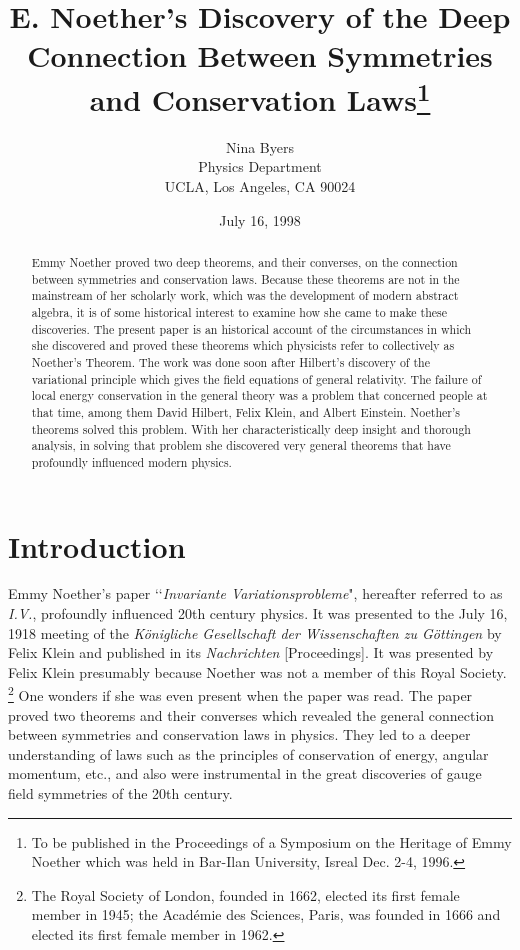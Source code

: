 \documentclass[12pt]{article}
\begin{document}
\title{E. Noether's Discovery of the Deep Connection Between
Symmetries and
                   Conservation Laws\footnote{To be published in
the Proceedings of a
Symposium on the Heritage of Emmy Noether which was held in 
Bar-Ilan University, Isreal Dec. 2-4,
1996.}}


\author{Nina Byers \\Physics
Department\\ UCLA, Los Angeles, CA 90024}
 \date{July 16, 1998}
 \maketitle

\begin{abstract} 
Emmy Noether proved two deep theorems, and their converses, on
 the connection between symmetries and conservation laws. Because these
 theorems are not in the mainstream of her scholarly work, 
  which was the development of modern
 abstract algebra,  it is of some historical interest to examine how
 she came to make these discoveries.  The present paper is an historical account of the
 circumstances in which she  discovered and proved  these theorems which
 physicists refer to collectively as Noether's Theorem.  The work was done 
 soon after  Hilbert's discovery of the variational principle which
 gives the field equations of general relativity.  The failure of local energy
 conservation in the general theory was a problem that concerned people at that
 time, among them David Hilbert, Felix Klein, and Albert Einstein.  Noether's
 theorems solved this problem.  With her characteristically deep insight and
 thorough analysis, in solving that problem she discovered very general theorems
 that have profoundly influenced modern physics. 
 \end{abstract}




\newpage
\section{Introduction} 

 
Emmy Noether's paper \lq\lq{\it{Invariante Variationsprobleme}}"\cite{noet},
hereafter referred to as {\it{I.V.}}, profoundly influenced 20th century
physics.  It was presented to the July 16, 1918 meeting of the
{\it{K\"{o}nigliche Gesellschaft der Wissenschaften zu G\"{o}ttingen}} by Felix 
Klein and published in its {\it{Nachrichten}} [Proceedings]. It was presented by 
 Felix Klein  presumably because
Noether was not a member of this Royal Society.%
{\footnote{The Royal Society of London, founded in 1662, elected its first
female member in 1945; the Acad\'{e}mie des Sciences, Paris, was founded in
1666 and elected its first female member in 1962.}} One wonders if she was even
present when the paper was read.  The paper proved two theorems and their
converses which revealed the general connection between symmetries and
conservation laws in physics.  They led to a deeper understanding of laws such
as the principles of conservation of energy, angular momentum, etc., and also
were instrumental in the great discoveries of gauge field symmetries of the 20th
century.\cite{byers}
\end{document}
